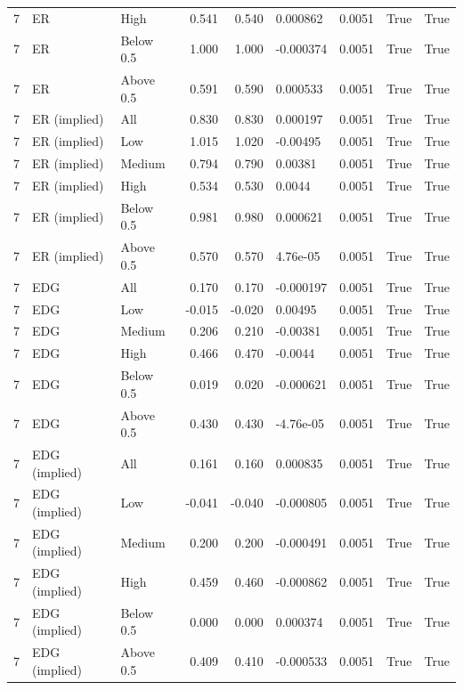 \documentclass[10pt]{article}
\begin{document}
\begin{landscape}
\begin{longtable}{rllrrllrr}
7 & ER & High & 0.541 & 0.540 & 0.000862 & 0.0051 & True & True \\
7 & ER & Below 0.5 & 1.000 & 1.000 & -0.000374 & 0.0051 & True & True \\
7 & ER & Above 0.5 & 0.591 & 0.590 & 0.000533 & 0.0051 & True & True \\
7 & ER (implied) & All & 0.830 & 0.830 & 0.000197 & 0.0051 & True & True \\
7 & ER (implied) & Low & 1.015 & 1.020 & -0.00495 & 0.0051 & True & True \\
7 & ER (implied) & Medium & 0.794 & 0.790 & 0.00381 & 0.0051 & True & True \\
7 & ER (implied) & High & 0.534 & 0.530 & 0.0044 & 0.0051 & True & True \\
7 & ER (implied) & Below 0.5 & 0.981 & 0.980 & 0.000621 & 0.0051 & True & True \\
7 & ER (implied) & Above 0.5 & 0.570 & 0.570 & 4.76e-05 & 0.0051 & True & True \\
7 & EDG & All & 0.170 & 0.170 & -0.000197 & 0.0051 & True & True \\
7 & EDG & Low & -0.015 & -0.020 & 0.00495 & 0.0051 & True & True \\
7 & EDG & Medium & 0.206 & 0.210 & -0.00381 & 0.0051 & True & True \\
7 & EDG & High & 0.466 & 0.470 & -0.0044 & 0.0051 & True & True \\
7 & EDG & Below 0.5 & 0.019 & 0.020 & -0.000621 & 0.0051 & True & True \\
7 & EDG & Above 0.5 & 0.430 & 0.430 & -4.76e-05 & 0.0051 & True & True \\
7 & EDG (implied) & All & 0.161 & 0.160 & 0.000835 & 0.0051 & True & True \\
7 & EDG (implied) & Low & -0.041 & -0.040 & -0.000805 & 0.0051 & True & True \\
7 & EDG (implied) & Medium & 0.200 & 0.200 & -0.000491 & 0.0051 & True & True \\
7 & EDG (implied) & High & 0.459 & 0.460 & -0.000862 & 0.0051 & True & True \\
7 & EDG (implied) & Below 0.5 & 0.000 & 0.000 & 0.000374 & 0.0051 & True & True \\
7 & EDG (implied) & Above 0.5 & 0.409 & 0.410 & -0.000533 & 0.0051 & True & True \\
\end{longtable}


\end{landscape}
\end{document}
